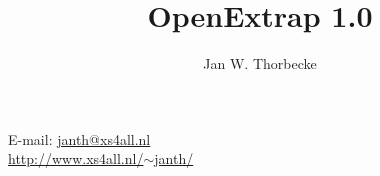 \documentclass[11pt]{article}
\makeatletter
\newcommand{\email}{{\sf janth@xs4all.nl}}
\newcommand{\wwwhref}{\href{http://www.xs4all.nl/~janth/}{http://www.xs4all.nl/$\sim$janth/}}
\makeatother
\begin{document}
\newdimen{\mybaselineskip}
\mybaselineskip=24pt
\title{OpenExtrap 1.0}

\author{Jan W. Thorbecke}


\maketitle
\begin{center}
E-mail: \href{mailto:janth@xs4all.nl}{\email{}} \\
\wwwhref \\
\end{center}
\newpage
\setcounter{tocdepth}{2}
\tableofcontents







\end{document}
